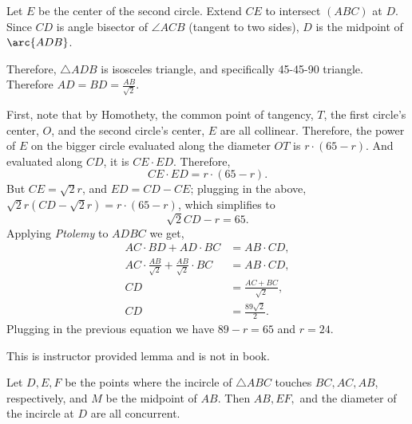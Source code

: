 \documentclass[11pt,twoside]{scrartcl}
\begin{document}
\begin{soln}
    Let $E$ be the center of the second circle. Extend $CE$ to intersect $(ABC)$ at $D$. Since $CD$ is angle bisector of $\angle ACB$ (tangent to two sides), $D$ is the midpoint of $\arc{ADB}$.

    Therefore, $\triangle ADB$ is isosceles triangle, and specifically 45-45-90 triangle. Therefore $AD = BD = \frac{AB}{\sqrt{2}}$.

    First, note that by Homothety, the common point of tangency, $T$, the first circle's center, $O$, and the second circle's center, $E$ are all collinear. Therefore, the power of $E$ on the bigger circle evaluated along the diameter $OT$ is $r \cdot (65 - r)$. And evaluated along $CD$, it is $CE \cdot ED$. Therefore,
    \[CE \cdot ED = r \cdot (65 - r).\]
    But $CE = \sqrt{2} r$, and $ED = CD - CE$; plugging in the above, $\sqrt{2} r (CD - \sqrt{2}r) = r \cdot (65 - r)$, which simplifies to
    \[\sqrt{2} CD - r = 65.\]
    Applying \emph{Ptolemy} to $ADBC$ we get,
    \begin{align*}
        AC \cdot BD + AD \cdot BC &= AB \cdot CD, \\
        AC \cdot \frac{AB}{\sqrt{2}} + \frac{AB}{\sqrt{2}} \cdot BC &= AB \cdot CD, \\
        CD &= \frac{AC + BC}{\sqrt{2}}, \\
        CD &= \frac{89\sqrt{2}}{2}.
    \end{align*}
    Plugging in the previous equation we have $89 - r = 65$ and $r = \boxed{24}$.
\end{soln}
\begin{remark}
    This is instructor provided lemma and is not in book.
\end{remark}
\begin{lemma}\label{extra_sess6_lemma}
    Let $D, E, F$ be the points where the incircle of $ \triangle ABC$ touches $BC, AC, AB$, respectively, and $M$ be the midpoint of $AB$. Then $AB, EF,$ and the diameter of the incircle at $D$ are all concurrent.
\end{lemma}
\end{document}
